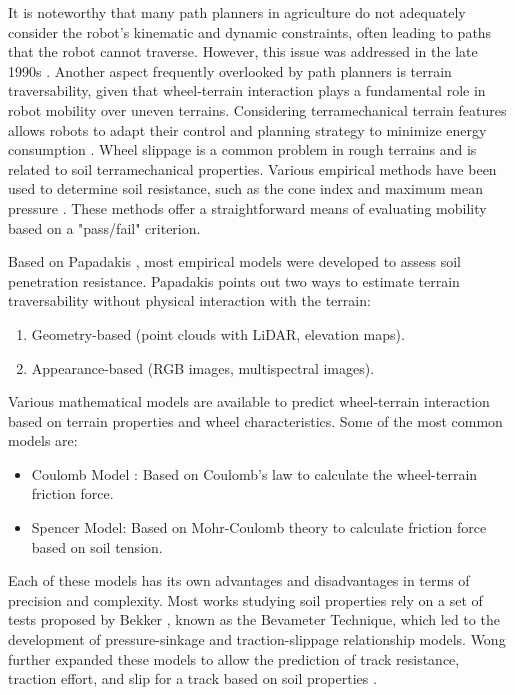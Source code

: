 \documentclass[conference]{IEEEtran}
\begin{document}
It is noteworthy that many path planners in agriculture do not adequately consider the robot's kinematic and dynamic constraints, often leading to paths that the robot cannot traverse. However, this issue was addressed in the late 1990s \cite{Auat2017}. Another aspect frequently overlooked by path planners is terrain traversability, given that wheel-terrain interaction plays a fundamental role in robot mobility over uneven terrains. Considering terramechanical terrain features allows robots to adapt their control and planning strategy to minimize energy consumption \cite{Ding}. Wheel slippage is a common problem in rough terrains and is related to soil terramechanical properties. Various empirical methods have been used to determine soil resistance, such as the cone index and maximum mean pressure \cite{ALMILLI2010151}. These methods offer a straightforward means of evaluating mobility based on a "pass/fail" criterion.

Based on Papadakis \cite{Papadakis2013}, most empirical models were developed to assess soil penetration resistance. Papadakis points out two ways to estimate terrain traversability without physical interaction with the terrain:

\begin{enumerate}
  \item Geometry-based (point clouds with LiDAR, elevation maps).
  \item Appearance-based (RGB images, multispectral images).
\end{enumerate}

Various mathematical models are available to predict wheel-terrain interaction based on terrain properties and wheel characteristics. Some of the most common models are:

\begin{itemize}
  \item Coulomb Model \cite{Ding}: Based on Coulomb's law to calculate the wheel-terrain friction force.
  \item Spencer Model: Based on Mohr-Coulomb theory \cite{Massoudi} to calculate friction force based on soil tension.
\end{itemize}

Each of these models has its own advantages and disadvantages in terms of precision and complexity. Most works studying soil properties rely on a set of tests proposed by Bekker \cite{bekker1956theory}, known as the Bevameter Technique, which led to the development of pressure-sinkage and traction-slippage relationship models. Wong further expanded these models to allow the prediction of track resistance, traction effort, and slip for a track based on soil properties \cite{Wong}.
\end{document}
